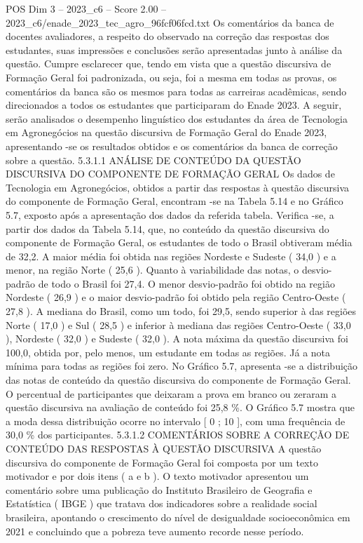 \begin{textsample}{POS Dim 3 – 2023\_c6 – Score 2.00 – 2023\_c6/enade\_2023\_tec\_agro\_96fcf06fcd.txt}
Os comentários da banca de docentes avaliadores, a respeito do observado na correção das respostas dos estudantes, suas impressões e conclusões serão apresentadas junto à análise da questão.
Cumpre esclarecer que, tendo em vista que a questão discursiva de Formação Geral foi padronizada, ou seja, foi a mesma em todas as provas, os comentários da banca são os mesmos para todas as carreiras acadêmicas, sendo direcionados a todos os estudantes que participaram do Enade 2023.
A seguir, serão analisados o desempenho linguístico dos estudantes da área de Tecnologia em Agronegócios na questão discursiva de Formação Geral do Enade 2023, apresentando -se os resultados obtidos e os comentários da banca de correção sobre a questão. 5.3.1.1 ANÁLISE DE CONTEÚDO DA QUESTÃO DISCURSIVA DO COMPONENTE DE FORMAÇÃO GERAL Os dados de Tecnologia em Agronegócios, obtidos a partir das respostas à questão discursiva do componente de Formação Geral, encontram -se na Tabela 5.14 e no Gráfico 5.7, exposto após a apresentação dos dados da referida tabela.
Verifica -se, a partir dos dados da Tabela 5.14, que, no conteúdo da questão discursiva do componente de Formação Geral, os estudantes de todo o Brasil obtiveram média de 32,2.
A maior média foi obtida nas regiões Nordeste e Sudeste ( 34,0 ) e a menor, na região Norte ( 25,6 ).
Quanto à variabilidade das notas, o desvio-padrão de todo o Brasil foi 27,4.
O menor desvio-padrão foi obtido na região Nordeste ( 26,9 ) e o maior desvio-padrão foi obtido pela região Centro-Oeste ( 27,8 ).
A mediana do Brasil, como um todo, foi 29,5, sendo superior à das regiões Norte ( 17,0 ) e Sul ( 28,5 ) e inferior à mediana das regiões Centro-Oeste ( 33,0 ), Nordeste ( 32,0 ) e Sudeste ( 32,0 ).
A nota máxima da questão discursiva foi 100,0, obtida por, pelo menos, um estudante em todas as regiões.
Já a nota mínima para todas as regiões foi zero.
No Gráfico 5.7, apresenta -se a distribuição das notas de conteúdo da questão discursiva do componente de Formação Geral.
O percentual de participantes que deixaram a prova em branco ou zeraram a questão discursiva na avaliação de conteúdo foi 25,8 \%.
O Gráfico 5.7 mostra que a moda dessa distribuição ocorre no intervalo [ 0 ; 10 ], com uma frequência de 30,0 \% dos participantes. 5.3.1.2 COMENTÁRIOS SOBRE A CORREÇÃO DE CONTEÚDO DAS RESPOSTAS À QUESTÃO DISCURSIVA A questão discursiva do componente de Formação Geral foi composta por um texto motivador e por dois itens ( a e b ).
O texto motivador apresentou um comentário sobre uma publicação do Instituto Brasileiro de Geografia e Estatística ( IBGE ) que tratava dos indicadores sobre a realidade social brasileira, apontando o crescimento do nível de desigualdade socioeconômica em 2021 e concluindo que a pobreza teve aumento recorde nesse período.

\end{textsample}
